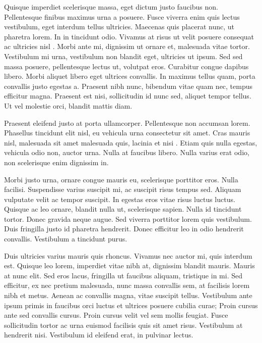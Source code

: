 \documentclass[conference]{IEEEtran}
\begin{document}
Quisque imperdiet scelerisque massa, eget dictum justo faucibus non. Pellentesque finibus maximus
urna a posuere. Fusce viverra enim quis lectus vestibulum, eget interdum tellus ultricies. Maecenas
quis placerat nunc, ut pharetra lorem. In in tincidunt odio. Vivamus at risus ut velit posuere
consequat ac ultricies nisl \cite{Nadir2012}. Morbi ante mi, dignissim ut ornare et, malesuada vitae tortor.
Vestibulum mi urna, vestibulum non blandit eget, ultricies ut ipsum. Sed sed massa posuere,
pellentesque lectus ut, volutpat eros. Curabitur congue dapibus libero. Morbi aliquet libero eget
ultrices convallis. In maximus tellus quam, porta convallis justo egestas a. Praesent nibh nunc,
bibendum vitae quam nec, tempus efficitur magna. Praesent est nisi, sollicitudin id nunc sed,
aliquet tempor tellus. Ut vel molestie orci, blandit mattis diam.

Praesent eleifend justo at porta ullamcorper. Pellentesque non accumsan lorem. Phasellus tincidunt
elit nisl, eu vehicula urna consectetur sit amet. Cras mauris nisl, malesuada sit amet malesuada
quis, lacinia et nisi \cite{SW1977}. Etiam quis nulla egestas, vehicula odio non, auctor urna. Nulla at faucibus
libero. Nulla varius erat odio, non scelerisque enim dignissim in.

Morbi justo urna, ornare congue mauris eu, scelerisque porttitor eros. Nulla facilisi. Suspendisse
varius suscipit mi, ac suscipit risus tempus sed. Aliquam vulputate velit ac tempor suscipit. In
egestas eros vitae risus luctus luctus. Quisque ac leo ornare, blandit nulla ut, scelerisque sapien.
Nulla id tincidunt tortor. Donec gravida neque augue. Sed viverra porttitor lorem quis vestibulum.
Duis fringilla justo id pharetra hendrerit. Donec efficitur leo in odio hendrerit convallis.
Vestibulum a tincidunt purus.

Duis ultricies varius mauris quis rhoncus. Vivamus nec auctor mi, quis interdum est. Quisque leo
lorem, imperdiet vitae nibh at, dignissim blandit mauris. Mauris at nunc elit. Sed eros lacus,
fringilla ut faucibus aliquam, tristique in mi. Sed efficitur, ex nec pretium malesuada, nunc massa
convallis sem, at facilisis lorem nibh et metus. Aenean ac convallis magna, vitae suscipit tellus.
Vestibulum ante ipsum primis in faucibus orci luctus et ultrices posuere cubilia curae; Proin cursus
ante sed convallis cursus. Proin cursus velit vel sem mollis feugiat. Fusce sollicitudin tortor ac
urna euismod facilisis quis sit amet risus. Vestibulum at hendrerit nisi. Vestibulum id eleifend
erat, in pulvinar lectus.
\end{document}
